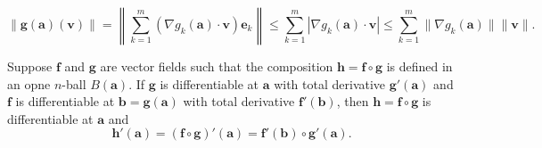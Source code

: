     \begin{proofenv}
        $$ \| \bm g(\bm a) (\bm v) \| = \left\| \sum_{k=1}^m \left( \nabla g_k(\bm a) \cdot \bm v\right) \bm e_k\right\| \le \sum_{k=1}^m \left| \nabla g_k(\bm a) \cdot \bm v\right| \le \sum_{k=1}^m \|\nabla g_k(\bm a)\| \|\bm v\|. $$
    \end{proofenv}
    \begin{theoremenv}
        Suppose $\bm f$ and $\bm g$ are vector fields such that the composition $\bm h = \bm f \circ \bm g$ is defined in an opne $n$-ball $B(\bm a)$. If $\bm g$ is differentiable at $\bm a$ with total derivative $\bm g'(\bm a)$ and $\bm f$ is differentiable at $\bm b = \bm g(\bm a)$ with total derivative $\bm f'(\bm b)$, then $\bm h = \bm f \circ \bm g$ is differentiable at $\bm a$ and
        $$\bm h'(\bm a) =  (\bm f \circ \bm g)'(\bm a) = \bm f'(\bm b) \circ \bm g'(\bm a). $$
    \end{theoremenv}
